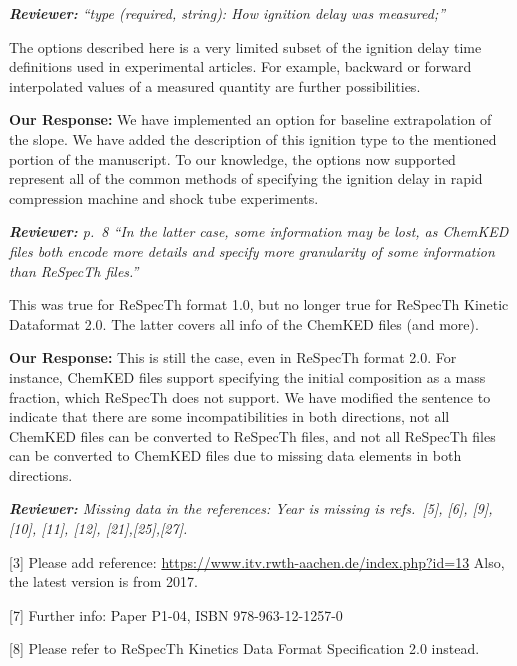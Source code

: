 \documentclass[a4paper,10pt]{elsarticle}
\newenvironment{reviewer}{\vspace{0.5\baselineskip}\begingroup\itshape\textbf{Reviewer:}}{\endgroup\vspace{0.5\baselineskip}}
\newenvironment{response}{\vspace{0.5\baselineskip}\textbf{Our Response:}}{\vspace{0.5\baselineskip}}
\begin{document}
\begin{reviewer}
    ``type (required, string): How ignition delay was measured;''

    The options described here is a very limited subset of the ignition delay time definitions used
    in experimental articles. For example, backward or forward interpolated values of a measured
    quantity are further possibilities.
\end{reviewer}

\begin{response}
    We have implemented an option for baseline extrapolation of the slope. We have added the
    description of this ignition type to the mentioned portion of the manuscript. To our knowledge,
    the options now supported represent all of the common methods of specifying the ignition delay
    in rapid compression machine and shock tube experiments.
\end{response}

\begin{reviewer}
    p.~8 ``In the latter case, some information may be lost, as ChemKED files both encode more
    details and specify more granularity of some information than ReSpecTh files.''

    This was true for ReSpecTh format 1.0, but no longer true for ReSpecTh Kinetic Dataformat 2.0.
    The latter covers all info of the ChemKED files (and more).
\end{reviewer}

\begin{response}
    This is still the case, even in ReSpecTh format 2.0. For instance, ChemKED files support
    specifying the initial composition as a mass fraction, which ReSpecTh does not support. We have
    modified the sentence to indicate that there are some incompatibilities in both directions, not
    all ChemKED files can be converted to ReSpecTh files, and not all ReSpecTh files can be
    converted to ChemKED files due to missing data elements in both directions.
\end{response}

\begin{reviewer}
    Missing data in the references: Year is missing is refs.~[5], [6], [9], [10], [11], [12],
    [21],[25],[27].

    [3] Please add reference: \url{https://www.itv.rwth-aachen.de/index.php?id=13}  Also, the
    latest version is from 2017.

    [7] Further info:  Paper P1-04, ISBN 978-963-12-1257-0

    [8] Please refer to ReSpecTh Kinetics Data Format Specification 2.0 instead.
\end{reviewer}
\end{document}

